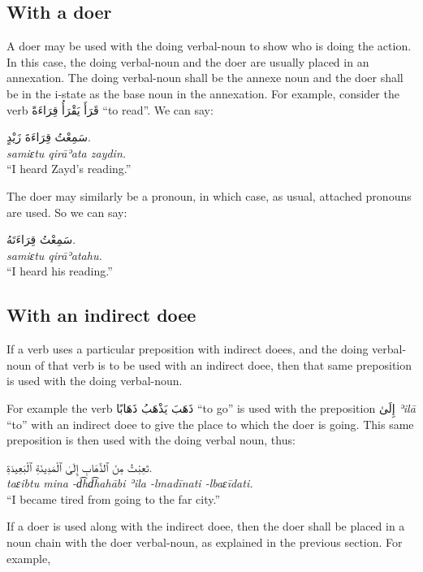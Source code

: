\documentclass[
  10pt,
]{book}
\begin{document}
\subsection{With a doer}\label{with-a-doer}

A doer may be used with the doing verbal-noun to show who is doing the action. In this case, the doing verbal-noun and the doer are usually placed in an annexation. The doing verbal-noun shall be the annexe noun and the doer shall be in the i-state as the base noun in the annexation. For example, consider the verb \foreignlanguage{arabic}{قَرَأَ يَقْرَأُ قِرَاءَةً} \enquote{to read}. We can say:

\foreignlanguage{arabic}{سَمِعْتُ قِرَاءَةَ زَيْدٍ.}\\
\emph{samiɛtu qirāʾata zaydin.}\\
\enquote{I heard Zayd's reading.}

The doer may similarly be a pronoun, in which case, as usual, attached pronouns are used. So we can say:

\foreignlanguage{arabic}{سَمِعْتُ قِرَاءَتَهُ.}\\
\emph{samiɛtu qirāʾatahu.}\\
\enquote{I heard his reading.}

\subsection{With an indirect doee}\label{with-an-indirect-doee}

If a verb uses a particular preposition with indirect doees, and the doing verbal-noun of that verb is to be used with an indirect doee, then that same preposition is used with the doing verbal-noun.

For example the verb \foreignlanguage{arabic}{ذَهَبَ يَذْهَبُ ذَهَابًا} \enquote{to go} is used with the preposition \foreignlanguage{arabic}{إِلَىٰ} \emph{ʾilā} \enquote{to} with an indirect doee to give the place to which the doer is going. This same preposition is then used with the doing verbal noun, thus:

\foreignlanguage{arabic}{تَعِبْتُ مِنَ ٱلذَّهَابِ إِلَىٰ ٱلْمَدِينَةِ ٱلْبَعِيدَةِ.}\\
\emph{taɛibtu mina -d͡hd͡hahābi ʾila -lmadīnati -lbaɛīdati.}\\
\enquote{I became tired from going to the far city.}

If a doer is used along with the indirect doee, then the doer shall be placed in a noun chain with the doer verbal-noun, as explained in the previous section. For example,
\end{document}
